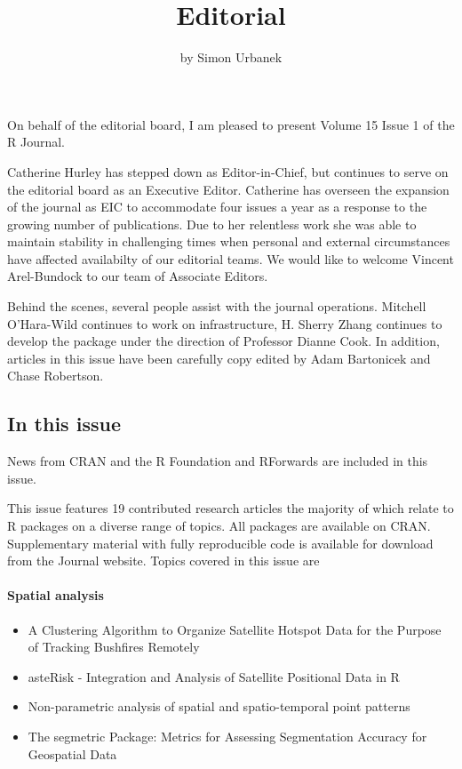 \title{Editorial}


\author{by Simon Urbanek}

\maketitle


On behalf of the editorial board, I am pleased to present Volume 15 Issue 1 of the R Journal.

Catherine Hurley has stepped down as Editor-in-Chief, but continues to serve on the editorial board as an Executive Editor.
Catherine has overseen the expansion of the journal as EIC to accommodate four issues a year as a response to the growing number of publications.
Due to her relentless work she was able to maintain stability in challenging times when personal and external circumstances have affected availabilty of our editorial teams. We would like to welcome Vincent Arel-Bundock to our team of Associate Editors.

Behind the scenes, several people assist with the journal operations. Mitchell O'Hara-Wild continues to work on infrastructure, H. Sherry Zhang continues to develop the  package under the direction of Professor Dianne Cook. In addition, articles in this issue have been carefully copy edited by Adam Bartonicek and Chase Robertson.

\hypertarget{in-this-issue}{%
\subsection{In this issue}\label{in-this-issue}}

News from CRAN and the R Foundation and RForwards are included in this issue.

\noindent This issue features 19 contributed research articles the majority of which relate to R packages
on a diverse range of topics. All packages are available on CRAN. Supplementary material with fully reproducible code is available for download from the Journal website. Topics covered in this issue are

\hypertarget{spatial-analysis}{%
\paragraph{Spatial analysis}\label{spatial-analysis}}

\begin{itemize}
\tightlist
\item
  A Clustering Algorithm to Organize Satellite Hotspot Data for the Purpose of Tracking Bushfires Remotely
\item
  asteRisk - Integration and Analysis of Satellite Positional Data in R
\item
  Non-parametric analysis of spatial and spatio-temporal point patterns
\item
  The segmetric Package: Metrics for Assessing Segmentation Accuracy for Geospatial Data
\end{itemize}


